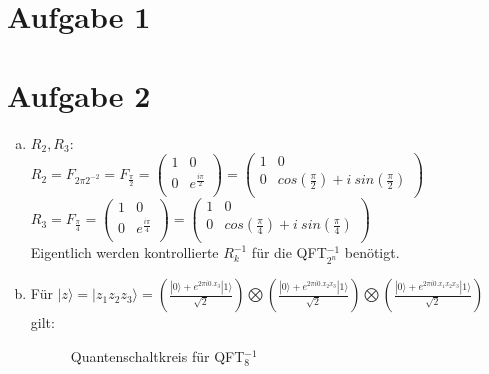 \documentclass[a4paper]{scrartcl}
\begin{document}
\section*{Aufgabe 1}

\newpage
\section*{Aufgabe 2}
\begin{enumerate}[a)]
\item
$R_2, R_3:$\\
$R_2=F_{2\pi 2^{-2}}=F_{\frac{\pi}{2}} = 
\begin{pmatrix}
1 & 0 \\ 0 & e^{\frac{i \pi}{2}} \\
\end{pmatrix} = 
\begin{pmatrix}
1 & 0 \\ 0 & cos(\frac{\pi}{2})+i~sin(\frac{\pi}{2})\\
\end{pmatrix}$ \\
$R_3=F_{\frac{\pi}{4}} = 
\begin{pmatrix}
1 & 0 \\ 0 & e^{\frac{i \pi}{4}} \\
\end{pmatrix} = 
\begin{pmatrix}
1 & 0 \\ 0 & cos(\frac{\pi}{4})+i~sin(\frac{\pi}{4})\\
\end{pmatrix}$ \\
Eigentlich werden kontrollierte $R_k^{-1}$ für die QFT$_{2^n}^{-1}$ benötigt.

\item Für $|z\rangle = |z_1 z_2 z_3\rangle= (\frac{|0\rangle+e^{2\pi i0.x_3} |1\rangle }{\sqrt{2}})\bigotimes(\frac{|0\rangle+e^{2\pi i0.x_2x_3} |1\rangle }{\sqrt{2}})\bigotimes(\frac{|0\rangle+e^{2\pi i0.x_1x_2x_3} |1\rangle }{\sqrt{2}})$ gilt:

\begin{figure}[htp] 
\caption{Quantenschaltkreis für QFT$_{8}^{-1}$}
\end{figure}


\end{enumerate}
\end{document}
